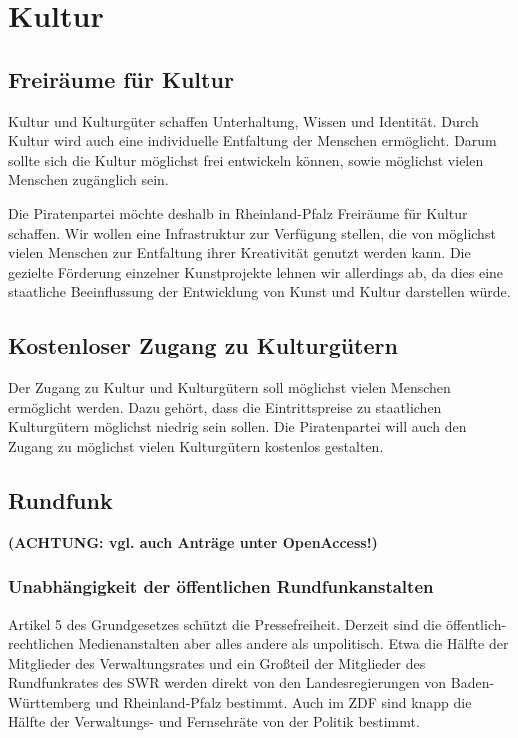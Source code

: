 \section{Kultur}

\subsection*{Freiräume für Kultur}
Kultur und Kulturgüter schaffen Unterhaltung, Wissen und Identität. Durch Kultur wird auch eine individuelle Entfaltung der Menschen ermöglicht. Darum sollte sich die Kultur möglichst frei entwickeln können, sowie möglichst vielen Menschen zugänglich sein.

Die Piratenpartei möchte deshalb in Rheinland-Pfalz Freiräume für Kultur schaffen. Wir wollen eine Infrastruktur zur Verfügung stellen, die von möglichst vielen Menschen zur Entfaltung ihrer Kreativität genutzt werden kann. Die gezielte Förderung einzelner Kunstprojekte lehnen wir allerdings ab, da dies eine staatliche Beeinflussung der Entwicklung von Kunst und Kultur darstellen würde.

\subsection*{Kostenloser Zugang zu Kulturgütern}
Der Zugang zu Kultur und Kulturgütern soll möglichst vielen Menschen ermöglicht werden. Dazu gehört, dass die Eintrittspreise zu staatlichen Kulturgütern möglichst niedrig sein sollen. Die Piratenpartei will auch den Zugang zu möglichst vielen Kulturgütern kostenlos gestalten.

\subsection*{Rundfunk}
\textbf{(ACHTUNG: vgl. auch Anträge unter OpenAccess!)}

\label{wp:kultur:rundfunk1}

\subsubsection{Unabhängigkeit der öffentlichen Rundfunkanstalten}
\abstimmung
Artikel 5 des Grundgesetzes schützt die Pressefreiheit. Derzeit sind die öffentlich-rechtlichen Medienanstalten aber alles andere als unpolitisch. Etwa die Hälfte der Mitglieder des Verwaltungsrates und ein Großteil der Mitglieder des Rundfunkrates des SWR werden direkt von den Landesregierungen von Baden-Württemberg und Rheinland-Pfalz bestimmt. Auch im ZDF sind knapp die Hälfte der Verwaltungs- und Fernsehräte von der Politik bestimmt.


